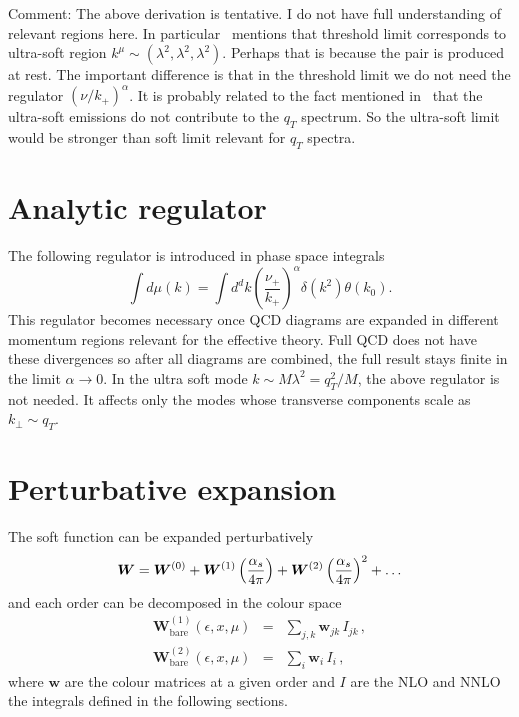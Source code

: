 \documentclass[a4paper,11pt]{report}
\numberwithin{equation}{section}
\begin{document}
Comment:
%
The above derivation is tentative. I do not have full understanding of
relevant regions here. In particular~\cite{Li:2013mia} mentions that threshold
limit corresponds to ultra-soft region $k^\mu \sim
(\lambda^2,\lambda^2,\lambda^2)$. Perhaps that is because the \ttbar pair is
produced at rest.
%
The important difference is that in the threshold limit we do not need the
regulator $(\nu/k_+)^\alpha$.
%
It is probably related to the fact mentioned in~\cite{Becher:2011dz} that the
ultra-soft emissions do not contribute to the $q_T$ spectrum. So the ultra-soft
limit would be stronger than soft limit relevant for $q_T$ spectra.

\section{Analytic regulator}

The following regulator is introduced in phase space
integrals~\cite{Becher:2011dz}
%
\begin{equation}
 \int d\mu(k) = \int d^d k 
 \left(\frac{\nu_+}{k_+}\right)^\alpha \delta(k^2) \theta(k_0).
\end{equation}
%
This regulator becomes necessary once QCD diagrams are expanded in different
momentum regions relevant for the effective theory. Full QCD does not have these
divergences so after all diagrams are combined, the full result stays finite in
the limit $\alpha \to 0$.
%
In the ultra soft mode $k\sim M \lambda^2  = q_T^2/M$, the above regulator is
not needed. It affects only the modes whose transverse components scale as
$k_\perp \sim q_T$.


\section{Perturbative expansion}
\label{eq:soft-func-pert-exp}

The soft function can be expanded perturbatively
%
\begin{equation}
  \mathbold{W} = 
  \mathbold{W}^{(0)} +
  \mathbold{W}^{(1)} \left(\frac{\as}{4\pi} \right) +
  \mathbold{W}^{(2)} \left(\frac{\as}{4\pi} \right)^2 + \ldots
\end{equation}
%
and each order can be decomposed in the colour
space~\cite{Li:2013mia,Ferroglia:2012uy}
%
\begin{eqnarray}
  \mathbold{W}^{(1)}_\text{bare} (\epsilon, x, \mu) & = &
  \sum_{j,k} \mathbold{w}_{jk}\, I_{jk}\,, \\
  \mathbold{W}^{(2)}_\text{bare} (\epsilon, x, \mu) & = &
  \sum_{i} \mathbold{w}_{i}\, I_{i}\,,
\end{eqnarray}
%
where $\mathbold{w}$ are the colour matrices at a given order and $I$ are the
NLO and NNLO the integrals defined in the following sections.
\end{document}
